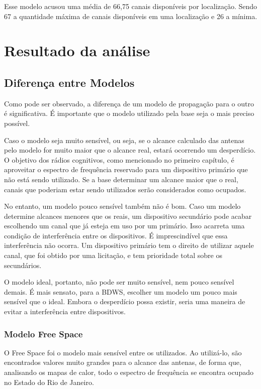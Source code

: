 \FloatBarrier

Esse modelo acusou uma média de 66,75 canais disponíveis por localização. Sendo 67 a quantidade máxima de canais disponíveis em uma localização e 26 a mínima.


\section{Resultado da análise}

\subsection{Diferença entre Modelos}

Como pode ser observado, a diferença de um modelo de propagação para o outro é significativa. É importante que o modelo utilizado pela base seja o mais preciso possível.

Caso o modelo seja muito sensível, ou seja, se o alcance calculado das antenas pelo modelo for muito maior que o alcance real, estará ocorrendo um desperdício. O objetivo dos rádios cognitivos, como mencionado no primeiro capítulo, é aproveitar o espectro de frequência reservado para um dispositivo primário que não está sendo utilizado. Se a base determinar um alcance maior que o real, canais que poderiam estar sendo utilizados serão considerados como ocupados.

No entanto, um modelo pouco sensível também não é bom. Caso um modelo determine alcances menores que os reais, um dispositivo secundário pode acabar escolhendo um canal que já esteja em uso por um primário. Isso acarreta uma condição de interferência entre os dispositivos. É imprescindível que essa interferência não ocorra. Um dispositivo primário tem o direito de utilizar aquele canal, que foi obtido por uma licitação, e tem prioridade total sobre os secundários.

O modelo ideal, portanto, não pode ser muito sensível, nem pouco sensível demais. É mais sensato, para a BDWS, escolher um modelo um pouco mais sensível que o ideal. Embora o desperdício possa existir, seria uma maneira de evitar a interferência entre dispositivos.

\subsubsection{Modelo Free Space}

O Free Space foi o modelo mais sensível entre os utilizados. Ao utilizá-lo, são encontrados valores muito grandes para o alcance das antenas, de forma que, analisando os mapas de calor, todo o espectro de frequência se encontra ocupado no Estado do Rio de Janeiro.

